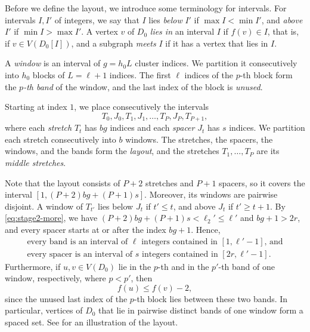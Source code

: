 \documentclass[fontsize=12pt,leading=14pt]{fullpaper}
\begin{document}
Before we define the layout, we introduce some terminology for intervals.
For intervals $I,I'$ of integers, we say that $I$ lies \emph{below} $I'$ if $\max I<\min I'$, and \emph{above} $I'$ if $\min I>\max I'$.
A vertex $v$ of $D_0$ \emph{lies in} an interval $I$ if $f(v)\in I$, that is, if $v\in V(D_0[I])$, and a subgraph \emph{meets} $I$ if it has a vertex that lies in $I$.

\begin{definition}\label{def:layout}
  A \emph{window} is an interval of $g=h_0L$ cluster indices.
  We partition it consecutively into $h_0$ blocks of $L=\ell+1$ indices.
  The first $\ell$ indices of the $p$-th block form the \emph{$p$-th band} of the window, and the last index of the block is \emph{unused}.

  Starting at index $1$, we place consecutively the intervals
  \[
    T_0,J_0,T_1,J_1,\dots,T_P,J_P,T_{P+1},
  \]
  where each \emph{stretch} $T_t$ has $bg$ indices and each \emph{spacer} $J_t$ has $s$ indices.
  We partition each stretch consecutively into $b$ windows.
  The stretches, the spacers, the windows, and the bands form the \emph{layout}, and the stretches $T_1,\dots,T_P$ are its \emph{middle stretches}.
\end{definition}

Note that the layout consists of $P+2$ stretches and $P+1$ spacers, so it covers the interval $[1,(P+2)bg+(P+1)s]$.
Moreover, its windows are pairwise disjoint.
A window of $T_{t'}$ lies below $J_t$ if $t'\le t$, and above $J_t$ if $t'\ge t+1$.
By \eqref{eq:stage2-more}, we have $(P+2)bg+(P+1)s<\ell_2'\le\ell'$ and $bg+1>2r$, and every spacer starts at or after the index $bg+1$.
Hence,
\begin{equation}\label{eq:stage2-layout}
  \begin{gathered}
    \text{every band is an interval of $\ell$ integers contained in $[1,\ell'-1]$, and}\\
    \text{every spacer is an interval of $s$ integers contained in $[2r,\ell'-1]$.}
  \end{gathered}
\end{equation}
Furthermore, if $u,v\in V(D_0)$ lie in the $p$-th and in the $p'$-th band of one window, respectively, where $p<p'$, then
\begin{equation}\label{eq:stage2-bands}
  f(u)\le f(v)-2,
\end{equation}
since the unused last index of the $p$-th block lies between these two bands.
In particular, vertices of $D_0$ that lie in pairwise distinct bands of one window form a spaced set.
See  for an illustration of the layout.
\end{document}

